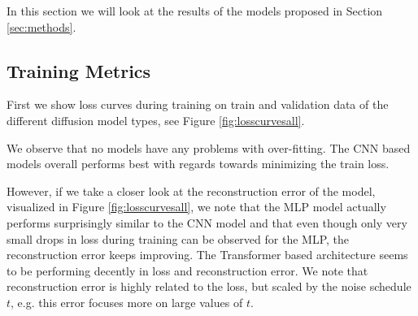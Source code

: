 
In this section we will look at the results of the models proposed in Section \ref{sec:methods}. 


\subsection{Training Metrics}
First we show loss curves during training on train and validation data of the different diffusion model types, see Figure \ref{fig:losscurvesall}.



We observe that no models have any problems with over-fitting. The CNN based models overall performs best with regards towards minimizing the train loss.





However, if we take a closer look at the reconstruction error of the model, visualized in Figure \ref{fig:losscurvesall}, we note that the MLP model actually performs surprisingly similar to the CNN model and that even though only very small drops in loss during training can be observed for the MLP, the reconstruction error keeps improving. The Transformer based architecture seems to be performing decently in loss and reconstruction error.
We note that reconstruction error is highly related to the loss, but scaled by the noise schedule $t$, e.g. this error focuses more on large values of $t$.


